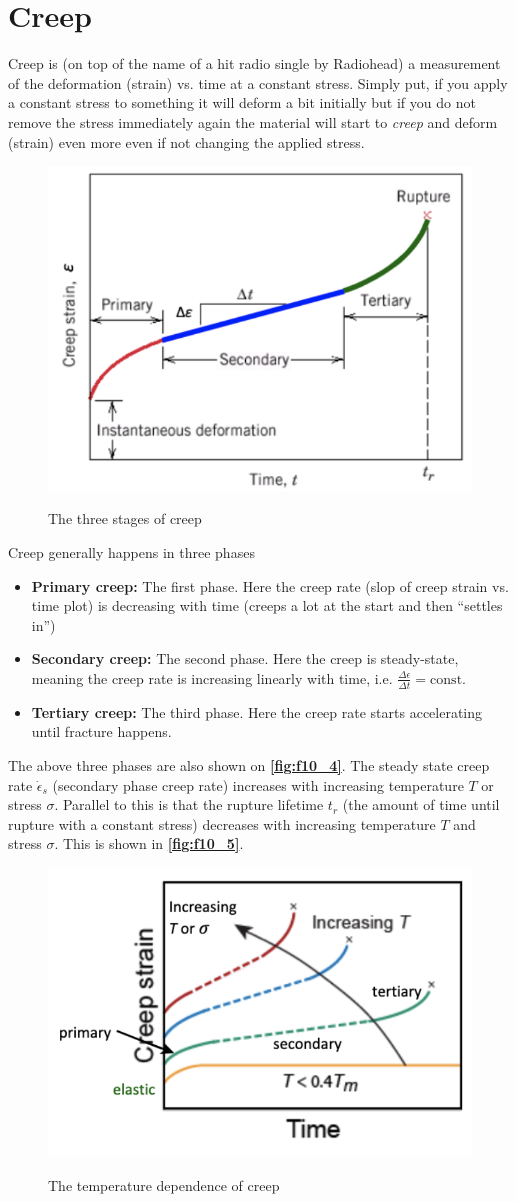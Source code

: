 \section{Creep}
Creep is (on top of the name of a hit radio single by Radiohead) a measurement of the deformation (strain) vs. time at a constant stress. Simply put, if you apply a constant stress to something it will deform a bit initially but if you do not remove the stress immediately again the material will start to \textit{creep} and deform (strain) even more even if not changing the applied stress.
\begin{figure} [ht]
  \centering
  \caption{The three stages of creep}
  \includegraphics[width=0.5\linewidth]{./figures/f10_4.png}
  \label{fig:f10_4}
\end{figure}

Creep generally happens in three phases
\begin{itemize}
  \item \textbf{Primary creep:} The first phase. Here the creep rate (slop of creep strain vs. time plot) is decreasing with time (creeps a lot at the start and then ``settles in'')
  \item \textbf{Secondary creep:} The second phase. Here the creep is steady-state, meaning the creep rate is increasing linearly with time, i.e. $\frac{\Delta \epsilon}{\Delta t} = \mathrm{const.}$
  \item \textbf{Tertiary creep:} The third phase. Here the creep rate starts accelerating until fracture happens.
\end{itemize}
The above three phases are also shown on \textbf{\autoref{fig:f10_4}}.
The steady state creep rate $\dot{\epsilon}_s$ (secondary phase creep rate) increases with increasing temperature $T$ or stress $\sigma$. Parallel to this is that the rupture lifetime $t_r$ (the amount of time until rupture with a constant stress) decreases with increasing temperature $T$ and stress $\sigma$. This is shown in \textbf{\autoref{fig:f10_5}}.
\begin{figure} [ht]
  \centering
  \caption{The temperature dependence of creep}
  \includegraphics[width=0.5\linewidth]{./figures/f10_5.png}
  \label{fig:f10_5}
\end{figure}

